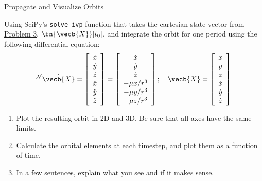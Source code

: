 \begin{hwkProblem}{4}{Propagate and Visualize Orbits} \label{hwk:p04}

	Using SciPy's \texttt{solve_ivp} function that takes the cartesian state vector from \hyperref[hwk:p03]{Problem 3}, \( \fn{\vecb{X}}[t_{0}] \), and integrate the orbit for one period using the following differential equation:
	\[
		{ }^{\mathcal{N}} \dot{\vecb{X}}=\left[\begin{array}{c}
				\dot{x} \\
				\dot{y} \\
				\dot{z} \\
				\ddot{x} \\
				\ddot{y} \\
				\ddot{z}
				\end{array}\right]=\left[\begin{array}{c}
				\dot{x} \\
				\dot{y} \\
				\dot{z} \\
				-\mu x / r^3 \\
				-\mu y / r^3 \\
				-\mu z / r^3
				\end{array}\right] ; \quad \vecb{X}=\left[\begin{array}{c}
				x \\
				y \\
				z \\
				\dot{x} \\
				\dot{y} \\
				\dot{z}
		\end{array}\right]
	\]

	\begin{enumerate}
		\item \label{hwk:p04a} Plot the resulting orbit in 2D and 3D. Be sure that all axes have the same limits.
		\item \label{hwk:p04b} Calculate the orbital elements at each timestep, and plot them as a function of time.
		\item \label{hwk:p04c} In a few sentences, explain what you see and if it makes sense.
	\end{enumerate}

	\hwkSol{} \label{hwk:s04}

	\hwkPart{} \label{hwk:s04a}


\end{hwkProblem}
